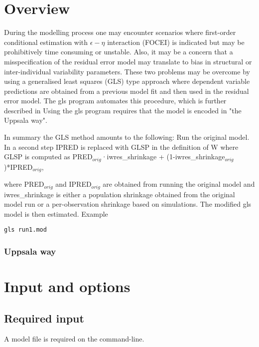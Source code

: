 



\maketitle
\newcommand{\guidetoolname}{gls}


\section{Overview}
During the modelling process one may encounter scenarios where first-order conditional estimation with $\epsilon - \eta$ 
interaction (FOCEI) is indicated but may be prohibitively time consuming or unstable. Also, it may be a concern that a misspecification 
of the residual error model may translate to bias in structural or inter-individual variability parameters. These two problems may be 
overcome by using a generalised least squares (GLS) type approach where dependent variable predictions are obtained from a 
previous model fit and then used in the residual error model. The gls program automates this procedure, which is further described 
in \cite{Ivaturi2}
Using the gls program requires that the model is encoded in "the Uppsala way".

In summary the GLS method amounts to the following: Run the original model. In a second step IPRED is replaced with GLSP in 
the definition of W where GLSP is computed as 
PRED$_{orig}$·iwres\_shrinkage + (1-iwres\_shrinkage$_{orig}$)*IPRED$_{orig}$, 

where  PRED$_{orig}$ and IPRED$_{orig}$ are obtained from running the original model and iwres\_shrinkage is either a population 
shrinkage obtained from the original model run or a per-observation shrinkage based on simulations.
The modified gls model is then estimated.
Example
\begin{verbatim}
gls run1.mod
\end{verbatim}

\subsubsection*{Uppsala way}


\section{Input and options}

\subsection{Required input}
A model file is required on the command-line.


